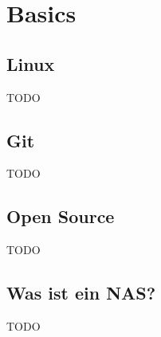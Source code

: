 \documentclass[
    ngerman,
    accentcolor=3b,
    fontsize= 12pt,
    a4paper,
    aspectratio=169,
    colorback=true,
    fancy_row_colors,
    leqno,
    fleqn,
    boxarc=3pt,
    fleqn,
    main,
    design=2008,
]{algoslides}
\begin{document}
    \section{Basics}\label{2}\label{Basics}
    \subsection{Linux}
    \begin{frame}[<+(1)->]
        \slidehead{}
        TODO
    \end{frame}
    \subsection{Git}
    \begin{frame}[<+(1)->]
        \slidehead{}
        TODO
    \end{frame}
    \subsection{Open Source}
    \begin{frame}[<+(1)->]
        \slidehead{}
        TODO
    \end{frame}
    \subsection{Was ist ein NAS?}
    \begin{frame}[<+(1)->]
        \slidehead{}
        TODO
    \end{frame}
\end{document}
